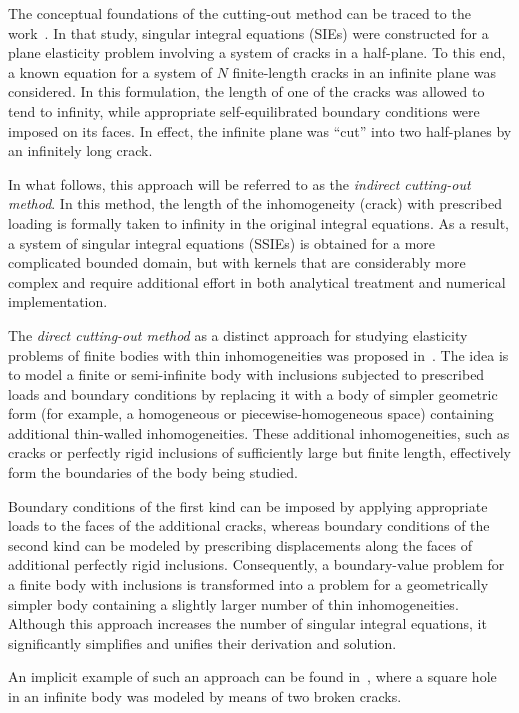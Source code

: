 The conceptual foundations of the cutting-out method can be traced to the work~\cite{Vasilev19}. In that study, singular integral equations (SIEs) were constructed for a plane elasticity problem involving a system of cracks in a half-plane. To this end, a known equation for a system of $N$ finite-length cracks in an infinite plane was considered. In this formulation, the length of one of the cracks was allowed to tend to infinity, while appropriate self-equilibrated boundary conditions were imposed on its faces. In effect, the infinite plane was ``cut'' into two half-planes by an infinitely long crack.

In what follows, this approach will be referred to as the \emph{indirect cutting-out method}. In this method, the length of the inhomogeneity (crack) with prescribed loading is formally taken to infinity in the original integral equations. As a result, a system of singular integral equations (SSIEs) is obtained for a more complicated bounded domain, but with kernels that are considerably more complex and require additional effort in both analytical treatment and numerical implementation.

The \emph{direct cutting-out method} as a distinct approach for studying elasticity problems of finite bodies with thin inhomogeneities was proposed in~\cite{Vasilev16,Vasilev27,Vasilev28}. The idea is to model a finite or semi-infinite body with inclusions subjected to prescribed loads and boundary conditions by replacing it with a body of simpler geometric form (for example, a homogeneous or piecewise-homogeneous space) containing additional thin-walled inhomogeneities. These additional inhomogeneities, such as cracks or perfectly rigid inclusions of sufficiently large but finite length, effectively form the boundaries of the body being studied.

Boundary conditions of the first kind can be imposed by applying appropriate loads to the faces of the additional cracks, whereas boundary conditions of the second kind can be modeled by prescribing displacements along the faces of additional perfectly rigid inclusions. Consequently, a boundary-value problem for a finite body with inclusions is transformed into a problem for a geometrically simpler body containing a slightly larger number of thin inhomogeneities. Although this approach increases the number of singular integral equations, it significantly simplifies and unifies their derivation and solution.

An implicit example of such an approach can be found in~\cite{Vasilev21}, where a square hole in an infinite body was modeled by means of two broken cracks.

